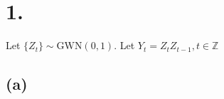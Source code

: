 \documentclass{article}
\begin{document}
\thispagestyle{firstpageheader}

\section*{1.}
{\Large 

Let $\{Z_t\} \sim \text{GWN}(0, 1).$ Let $Y_t = Z_tZ_{t-1}, t \in \mathbb{Z} $



\subsection*{(a)}

}
\end{document}
